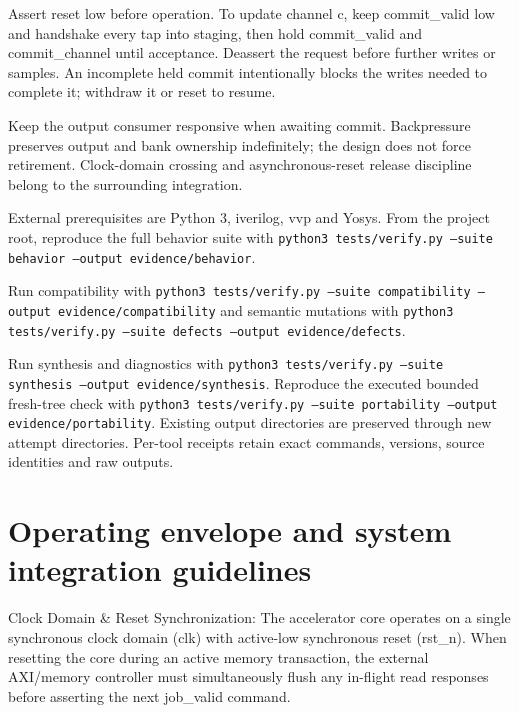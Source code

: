 \documentclass[11pt,a4paper]{article}
\begin{document}
Assert reset low before operation. To update channel c,\allowbreak{} keep commit\_\allowbreak{}valid low and handshake every tap into staging,\allowbreak{} then hold commit\_\allowbreak{}valid and commit\_\allowbreak{}channel until acceptance. Deassert the request before further writes or samples. An incomplete held commit intentionally blocks the writes needed to complete it; withdraw it or reset to resume.


Keep the output consumer responsive when awaiting commit. Backpressure preserves output and bank ownership indefinitely; the design does not force retirement. Clock-domain crossing and asynchronous-reset release discipline belong to the surrounding integration.


External prerequisites are Python 3,\allowbreak{} iverilog,\allowbreak{} vvp and Yosys. From the project root,\allowbreak{} reproduce the full behavior suite with \texttt{python3 tests/\allowbreak{}verify.py --suite behavior --output evidence/\allowbreak{}behavior}.


Run compatibility with \texttt{python3 tests/\allowbreak{}verify.py --suite compatibility --output evidence/\allowbreak{}compatibility} and semantic mutations with \texttt{python3 tests/\allowbreak{}verify.py --suite defects --output evidence/\allowbreak{}defects}.


Run synthesis and diagnostics with \texttt{python3 tests/\allowbreak{}verify.py --suite synthesis --output evidence/\allowbreak{}synthesis}. Reproduce the executed bounded fresh-tree check with \texttt{python3 tests/\allowbreak{}verify.py --suite portability --output evidence/\allowbreak{}portability}. Existing output directories are preserved through new attempt directories. Per-tool receipts retain exact commands,\allowbreak{} versions,\allowbreak{} source identities and raw outputs.


\section{Operating envelope and system integration guidelines}

Clock Domain \& Reset Synchronization: The accelerator core operates on a single synchronous clock domain (\allowbreak{}clk)\allowbreak{} with active-low synchronous reset (\allowbreak{}rst\_\allowbreak{}n)\allowbreak{}. When resetting the core during an active memory transaction,\allowbreak{} the external AXI/\allowbreak{}memory controller must simultaneously flush any in-flight read responses before asserting the next job\_\allowbreak{}valid command.
\end{document}
